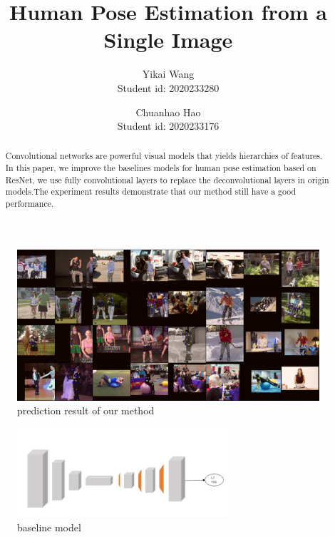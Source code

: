 \documentclass[final]{cvpr}
\begin{document}
\title{Human Pose Estimation from a Single Image}

\author{Yikai Wang\\
Student id: 2020233280\\
{}
\and
Chuanhao Hao\\
Student id: 2020233176\\
{}
}

\maketitle


\begin{abstract}
Convolutional networks are powerful visual models that yields hierarchies of features. In this paper, we improve the baselines models for human pose estimation based on ResNet\cite{he2016deep}, we use fully convolutional layers to replace the deconvolutional layers in origin models.The experiment results demonstrate that our method still have a good performance.
\end{abstract}


\begin{figure}[h]
\centering
\includegraphics[width=1.1\textwidth]{pred.jpg}
\caption{prediction result of our method}
\end{figure}

\begin{figure}[h]
\centering
\includegraphics[width=0.7\textwidth]{Resnet.jpg}
\caption{baseline model}
\end{figure}
\end{document}
